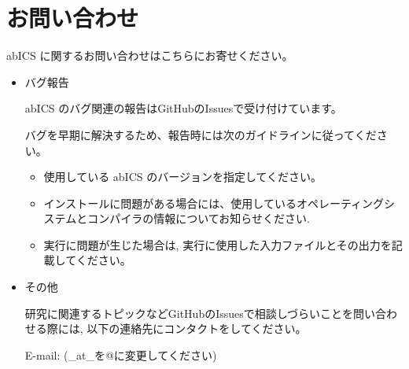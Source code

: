 \documentclass[letterpaper,10pt,dvipdfmx]{sphinxmanual}
\begin{document}
\chapter{お問い合わせ}
\label{\detokenize{contact/index::doc}}\label{\detokenize{contact/index:id1}}
abICS に関するお問い合わせはこちらにお寄せください。
\begin{itemize}
\item {} 
バグ報告

abICS のバグ関連の報告はGitHubのIssuesで受け付けています。

バグを早期に解決するため、報告時には次のガイドラインに従ってください。
\begin{itemize}
\item {} 
使用している abICS のバージョンを指定してください。

\item {} 
インストールに問題がある場合には、使用しているオペレーティングシステムとコンパイラの情報についてお知らせください.

\item {} 
実行に問題が生じた場合は, 実行に使用した入力ファイルとその出力を記載してください。

\end{itemize}

\item {} 
その他

研究に関連するトピックなどGitHubのIssuesで相談しづらいことを問い合わせる際には, 以下の連絡先にコンタクトをしてください。

E-mail:  (\_at\_を@に変更してください)

\end{itemize}



\renewcommand{\indexname}{索引}
\printindex
\end{document}
